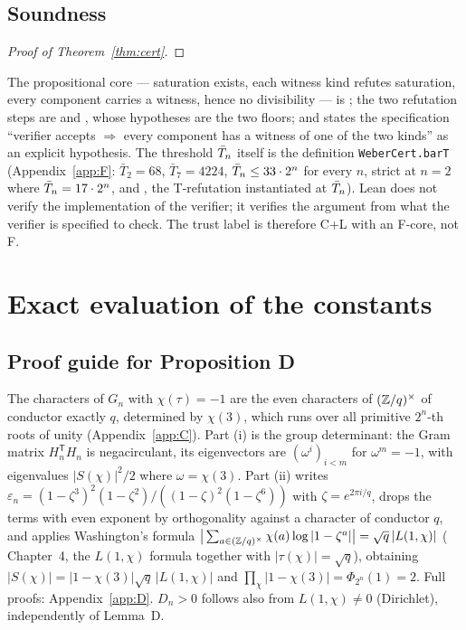 \documentclass[11pt]{amsart}
\theoremstyle{remark}\newtheorem{remark}[theorem]{Remark}
\theoremstyle{definition}\newtheorem{definition}[theorem]{Definition}
\theoremstyle{definition}\newtheorem{algorithm}[theorem]{Algorithm}
\providecommand{\proofsdir}{../../proofs} %
\begin{document}
\subsection{Soundness}
\begin{proof}[Proof of Theorem~\ref{thm:cert}]

\end{proof}
The propositional core --- saturation exists, each witness kind refutes saturation, every component carries a witness, hence no divisibility --- is ; the two refutation steps are  and , whose hypotheses are the two floors; and  states the specification ``verifier accepts $\Rightarrow$ every component has a witness of one of the two kinds'' as an explicit hypothesis. The threshold $\bar T_n$ itself is the definition \texttt{WeberCert.barT} (Appendix~\ref{app:F}: $\bar T_2=68$, $\bar T_7=4224$, $\bar T_n\le33\cdot2^n$ for every $n$, strict at $n=2$ where $\bar T_n=17\cdot2^n$, and , the T-refutation instantiated at $\bar T_n$). Lean does not verify the implementation of the verifier; it verifies the argument from what the verifier is specified to check. The trust label is therefore C+L with an F-core, not F.
\section{Exact evaluation of the constants}\label{sec:const}
\subsection{Proof guide for Proposition D}
The characters of $G_n$ with $\chi(\tau)=-1$ are the even characters of $(\mathbb{Z}/q)^\times$ of conductor exactly $q$, determined by $\chi(3)$, which runs over all primitive $2^n$-th roots of unity (Appendix~\ref{app:C}). Part (i) is the group determinant: the Gram matrix $H_n^{\mathsf T}H_n$ is negacirculant, its eigenvectors are $(\omega^i)_{i<m}$ for $\omega^m=-1$, with eigenvalues $|S(\chi)|^2/2$ where $\omega=\chi(3)$. Part (ii) writes $\varepsilon_n=(1-\zeta^3)^2(1-\zeta^2)/((1-\zeta)^2(1-\zeta^6))$ with $\zeta=e^{2\pi i/q}$, drops the terms with even exponent by orthogonality against a character of conductor $q$, and applies Washington's formula $\big|\sum_{a\in(\mathbb{Z}/q)^\times}\chi(a)\log|1-\zeta^a|\big|=\sqrt q\,|L(1,\chi)|$ (\cite{Wash} Chapter~4, the $L(1,\chi)$ formula together with $|\tau(\chi)|=\sqrt q$), obtaining $|S(\chi)|=|1-\chi(3)|\sqrt q\,|L(1,\chi)|$ and $\prod_\chi|1-\chi(3)|=\Phi_{2^n}(1)=2$. Full proofs: Appendix~\ref{app:D}. $D_n>0$ follows also from $L(1,\chi)\ne0$ (Dirichlet), independently of Lemma~D.
\end{document}
